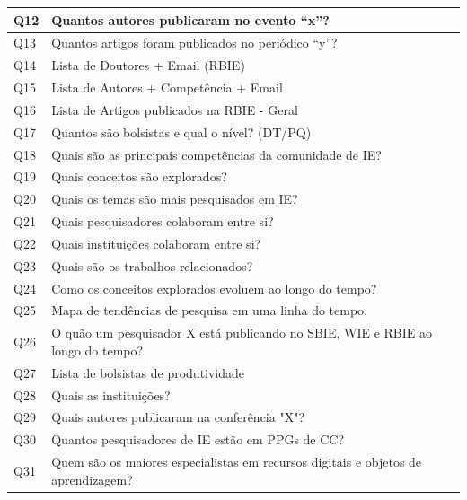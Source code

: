 \begin{table}[!ht]
\begin{tabular}{|l|l|}
Q12 & Quantos autores publicaram no evento “x”?                                         \\ \hline
Q13 & Quantos artigos foram publicados no periódico “y”?                                \\ \hline
Q14 & Lista de Doutores + Email (RBIE)                                                  \\ \hline
Q15 & Lista de Autores + Competência + Email                                            \\ \hline
Q16 & Lista de Artigos publicados na RBIE - Geral                                       \\ \hline
Q17 & Quantos são bolsistas e qual o nível? (DT/PQ)                                     \\ \hline
Q18 & Quais são as principais competências da comunidade de IE?                         \\ \hline
Q19 & Quais conceitos são explorados?                                                   \\ \hline
Q20 & Quais os temas são mais pesquisados em IE?                                        \\ \hline
Q21 & Quais pesquisadores colaboram entre si?                                           \\ \hline
Q22 & Quais instituições colaboram entre si?                                            \\ \hline
Q23 & Quais são os trabalhos relacionados?                                              \\ \hline
Q24 & Como os conceitos explorados evoluem ao longo do tempo?                           \\ \hline
Q25 & Mapa de tendências de pesquisa em uma linha do tempo.                             \\ \hline
Q26 & O quão um pesquisador X está publicando no SBIE, WIE e RBIE ao longo do tempo?    \\ \hline
Q27 & Lista de bolsistas de produtividade                                               \\ \hline
Q28 & Quais as instituições?                                                            \\ \hline
Q29 & Quais autores publicaram na conferência "X"?                                      \\ \hline
Q30 & Quantos pesquisadores de IE estão em PPGs de CC?                                  \\ \hline
Q31 & Quem são os maiores especialistas em recursos digitais e objetos de aprendizagem? \\ \hline
\end{tabular}
\end{table}

